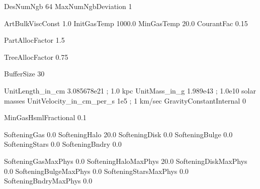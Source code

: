 DesNumNgb           64
MaxNumNgbDeviation  1

ArtBulkViscConst    1.0
InitGasTemp         1000.0  %
MinGasTemp          20.0    
CourantFac          0.15



PartAllocFactor       1.5

TreeAllocFactor       0.75

BufferSize            30





UnitLength_in_cm         3.085678e21        ;  1.0 kpc
UnitMass_in_g            1.989e43           ;  1.0e10 solar masses
UnitVelocity_in_cm_per_s 1e5                ;  1 km/sec
GravityConstantInternal  0



MinGasHsmlFractional     0.1  %

SofteningGas        0.0
SofteningHalo       20.0
SofteningDisk       0.0
SofteningBulge      0.0           
SofteningStars      0.0
SofteningBndry      0.0

SofteningGasMaxPhys       0.0
SofteningHaloMaxPhys      20.0
SofteningDiskMaxPhys      0.0
SofteningBulgeMaxPhys     0.0
SofteningStarsMaxPhys     0.0
SofteningBndryMaxPhys     0.0












